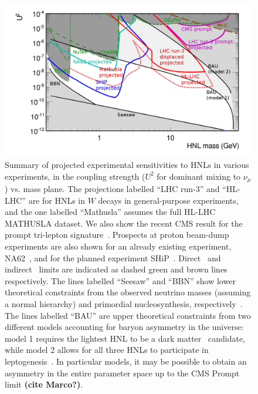 {\begin{figure}[th]
\centering
\includegraphics[width=0.99\linewidth]{plots/BigPicture.png}
\caption{Summary of projected experimental sensitivities to HNLs in various experiments, in the coupling strength ($U^2$ for dominant mixing to $\nu_\mu$) vs. mass plane. The projections labelled ``LHC run-3'' and ``HL-LHC'' are for HNLs in $W$ decays in general-purpose experiments, and the one labelled ``Mathusla'' assumes the full HL-LHC MATHUSLA dataset. We also show the recent CMS result for the prompt tri-lepton signature~\cite{Sirunyan:2018mtv}. Prospects at proton beam-dump experiments are also shown for an already existing experiment, NA62~\cite{Lanfranchi2017}, and for the planned experiment SHiP~\cite{SHiP2015}. Direct~\cite{Bernardi1988,CHARM1986,NuTeV1999,Delphi1997,CMS2015b} and indirect~\cite{MEG2013,Antusch2015} limits are indicated as dashed green and brown lines respectively. The lines labelled ``Seesaw'' and ``BBN'' show lower theoretical constraints from the observed neutrino masses (assuming a normal hierarchy) and primordial nucleosynthesis, respectively~\cite{Canetti2013b}. The lines labelled ``BAU'' are upper theoretical constraints from two different models accounting for baryon asymmetry in the universe: model 1 requires the lightest HNL to be a dark matter~\cite{Canetti2013b} candidate, while model 2 allows for all three HNLs to participate in leptogenesis~\cite{Canetti2014}. In particular models, it may be possible to obtain an asymmetry in the entire parameter space up to the CMS Prompt limit {\bf (cite Marco?)}. }
\label{fig:HNLsensitivity}
\end{figure}

}
